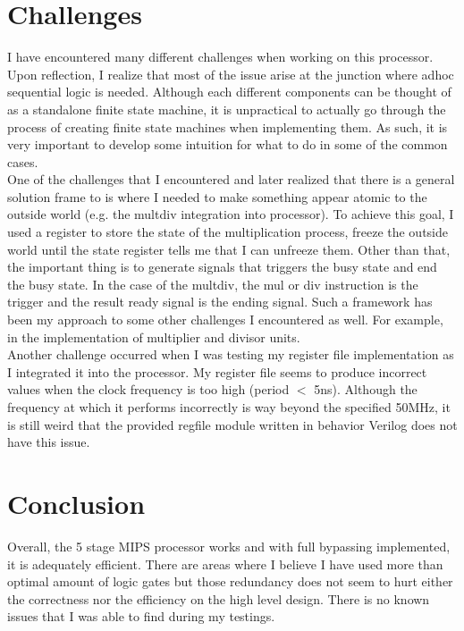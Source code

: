 \documentclass{article}
\begin{document}
	\section{Challenges}
	I have encountered many different challenges when working on this processor. Upon reflection, I realize that most of the issue arise at the junction where adhoc sequential logic is needed. Although each different components can be thought of as a standalone finite state machine, it is unpractical to actually go through the process of creating finite state machines when implementing them. As such, it  is very important to develop some intuition for what to do in some of the common cases. \\
	One of the challenges that I encountered and later realized that there is a general solution frame to is where I needed to make something appear atomic to the outside world (e.g. the multdiv integration into processor). To achieve this goal, I used a register to store the state of the multiplication process, freeze the outside world until the state register tells me that I can unfreeze them. Other than that, the important thing is to generate signals that triggers the busy state and end the busy state. In the case of the multdiv, the mul or div instruction is the trigger and the result ready signal is the ending signal. Such a framework has been my approach to some other challenges I encountered as well. For example, in the implementation of multiplier and divisor units. \\
	Another challenge occurred when I was testing my register file implementation as I integrated it into the processor. My register file seems to produce incorrect values when the clock frequency is too high (period $<$ 5ns). Although the frequency at which it performs incorrectly is way beyond the specified 50MHz, it is still weird that the provided regfile module written in behavior Verilog does not have this issue. 
	\section{Conclusion}
	Overall, the 5 stage MIPS processor works and with full bypassing implemented, it is adequately efficient. There are areas where I believe I have used more than optimal amount of logic gates but those redundancy does not seem to hurt either the correctness nor the efficiency on the high level design. There is no known issues that I was able to find during my testings.
\end{document}
